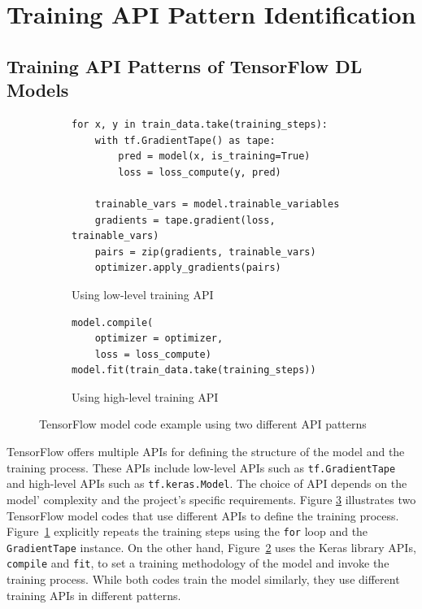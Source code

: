\section{Training API Pattern Identification}\label{sec:pattern}

\subsection{Training API Patterns of TensorFlow DL Models}

\renewcommand\tabularxcolumn[1]{m{#1}}
\begin{figure}[ht!]
\centering
  \begin{subfigure}[b]{\textwidth}
    \begin{lstlisting}[style=mpython]
for x, y in train_data.take(training_steps):
    with tf.GradientTape() as tape:
        pred = model(x, is_training=True)
        loss = loss_compute(y, pred)

    trainable_vars = model.trainable_variables
    gradients = tape.gradient(loss, trainable_vars)
    pairs = zip(gradients, trainable_vars)
    optimizer.apply_gradients(pairs)\end{lstlisting}
    \caption{Using low-level training API}
    \label{fig:pattern:ex01:a}
  \end{subfigure}
  \hspace{5mm}
  \begin{subfigure}[b]{\textwidth}
    \begin{lstlisting}[style=mpython]
model.compile(
    optimizer = optimizer, 
    loss = loss_compute) 
model.fit(train_data.take(training_steps))\end{lstlisting} 
    \caption{Using high-level training API}
    \label{fig:pattern:ex01:b}
  \end{subfigure}

  \caption{TensorFlow model code example using two different API patterns}
  \label{fig:pattern:ex01}
\end{figure}

\noindent
TensorFlow offers multiple APIs for defining the structure of the model and the
training process. 
These APIs include low-level APIs such as {\tt tf.GradientTape} and high-level
APIs such as {\tt tf.keras.Model}.
The choice of API depends on the model' complexity and the project's specific
requirements.
Figure \ref{fig:pattern:ex01} illustrates two TensorFlow model codes that use
different APIs to define the training process. 
Figure~\ref{fig:pattern:ex01:a} explicitly repeats the training
steps using the {\tt for} loop and the {\tt GradientTape} instance. 
On the other hand, Figure~\ref{fig:pattern:ex01:b} uses the Keras
library APIs, {\tt compile} and {\tt fit}, to set a training methodology of the
model and invoke the training process. 
While both codes train the model similarly, they use different training
APIs in different patterns.

